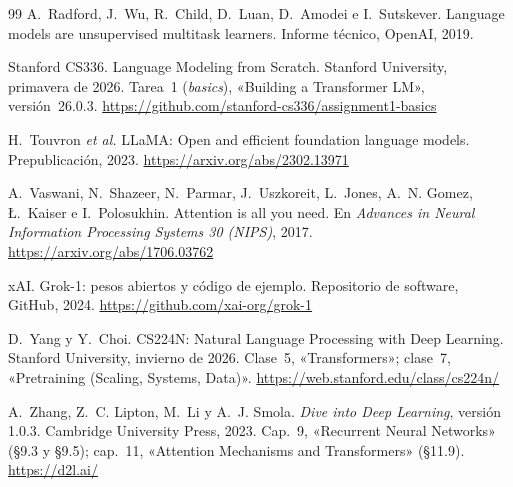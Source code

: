 \begin{thebibliography}{99}
A.~Radford, J.~Wu, R.~Child, D.~Luan, D.~Amodei e I.~Sutskever.
\newblock Language models are unsupervised multitask learners.
\newblock Informe técnico, OpenAI, 2019.

Stanford CS336.
\newblock Language Modeling from Scratch.
\newblock Stanford University, primavera de 2026. Tarea~1 (\emph{basics}), «Building a Transformer LM», versión~26.0.3.
\newblock \url{https://github.com/stanford-cs336/assignment1-basics}

H.~Touvron \emph{et al.}
\newblock LLaMA: Open and efficient foundation language models.
\newblock Prepublicación, 2023.
\newblock \url{https://arxiv.org/abs/2302.13971}

A.~Vaswani, N.~Shazeer, N.~Parmar, J.~Uszkoreit, L.~Jones, A.~N. Gomez, Ł.~Kaiser e I.~Polosukhin.
\newblock Attention is all you need.
\newblock En \emph{Advances in Neural Information Processing Systems 30 (NIPS)}, 2017.
\newblock \url{https://arxiv.org/abs/1706.03762}

xAI.
\newblock Grok-1: pesos abiertos y código de ejemplo.
\newblock Repositorio de software, GitHub, 2024.
\newblock \url{https://github.com/xai-org/grok-1}

D.~Yang y Y.~Choi.
\newblock CS224N: Natural Language Processing with Deep Learning.
\newblock Stanford University, invierno de 2026. Clase~5, «Transformers»; clase~7, «Pretraining (Scaling, Systems, Data)».
\newblock \url{https://web.stanford.edu/class/cs224n/}

A.~Zhang, Z.~C. Lipton, M.~Li y A.~J. Smola.
\newblock \emph{Dive into Deep Learning}, versión 1.0.3.
\newblock Cambridge University Press, 2023.
\newblock Cap.~9, «Recurrent Neural Networks» (§9.3 y §9.5); cap.~11, «Attention Mechanisms and Transformers» (§11.9).
\newblock \url{https://d2l.ai/}

\end{thebibliography}
